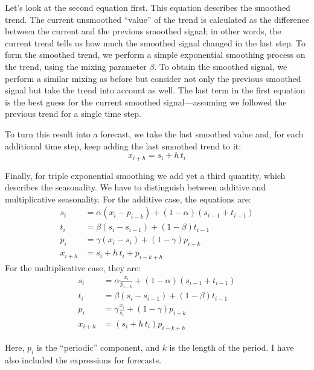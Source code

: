 \noindent Let's look at the second equation first. This equation describes the
smoothed trend. The current unsmoothed ``value'' of the trend is
calculated as the difference between the current and the previous
smoothed signal; in other words, the current trend tells us how much
the smoothed signal changed in the last step. To form the smoothed
trend, we perform a simple exponential smoothing process on the trend,
using the mixing parameter $\beta$. To obtain the smoothed signal, we
perform a similar mixing as before but consider not only the previous
smoothed signal but take the trend into account as well.  The last
term in the first equation is the best guess for the current smoothed
signal---assuming we followed the previous trend for a single time
step.


To turn this result into a forecast, we take the last smoothed value
and, for each additional time step, keep adding the last smoothed
trend to it:\vspace*{-3pt}
%
\[
x_{i+h} = s_i + h \, t_i
\]\vskip-6pt

Finally, for triple exponential smoothing  we add yet a third quantity,
which describes the seasonality. We have to distinguish between
additive and multiplicative seasonality. For the additive case, the
equations are:\vspace*{-3pt}
%
\begin{align*}
  s_i & = \alpha ( x_i - p_{i-k} ) + ( 1 - \alpha ) ( s_{i-1} + t_{i-1} ) \\
  t_i & = \beta ( s_i - s_{i-1} ) + ( 1 - \beta ) t_{i-1} \\
  p_i & = \gamma ( x_i - s_i ) + ( 1 - \gamma ) p_{i-k} \\
  x_{i+h} & = s_i + h \, t_i + p_{i-k+h}
\end{align*}
%
For the multiplicative case, they are:\vspace*{-3pt}
%
\begin{align*}
  s_i & = \alpha \frac{x_i}{p_{i-k}} + ( 1 - \alpha ) ( s_{i-1} + t_{i-1} ) \\
  t_i & = \beta ( s_i - s_{i-1} ) + ( 1 - \beta ) t_{i-1} \\
  p_i & = \gamma \frac{x_i}{s_i} + ( 1 - \gamma ) p_{i-k} \\
  x_{i+h} & = (s_i + h \, t_i) p_{i-k+h}
\end{align*}
%

\noindent Here, $p_i$ is the ``periodic'' component, and $k$ is the length of the
period. I have also included the expressions for forecasts.

